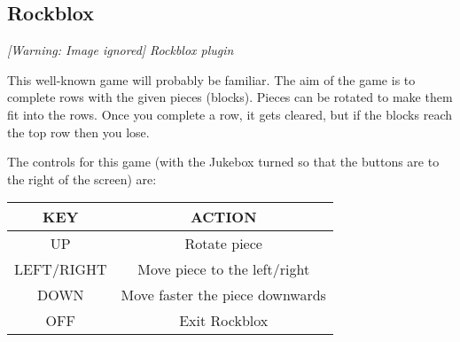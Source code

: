 \subsection{Rockblox}
{\centering\itshape
  [Warning: Image ignored] %
 \newline
Rockblox plugin
\par}

This well{}-known game will probably be familiar. The aim of the game is
to complete rows with the given pieces (blocks). Pieces can be rotated
to make them fit into the rows.  Once you complete a row, it gets
cleared, but if the blocks reach the top row then you lose.

The controls for this game (with the Jukebox turned so that the buttons
are to the right of the screen) are:

\begin{table}[h!]
\begin{center}
\begin{tabular}{|c|c|}
\hline
KEY & ACTION \\\hline
UP & Rotate piece \\\hline
LEFT/RIGHT & Move piece to the left/right \\\hline
DOWN & Move faster the piece downwards \\\hline
OFF & Exit Rockblox\\\hline
\end{tabular}
\end{center}
\end{table}

